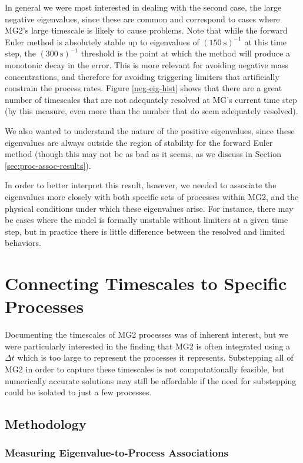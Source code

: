 \documentclass [11pt, proquest] {uwthesis}[2020/02/24]
\begin{document}
In general we were most interested in dealing with the second case, the large negative eigenvalues, since these are common and correspond to cases where MG2's large timescale is likely to cause problems. Note that while the forward Euler method is absolutely stable up to eigenvalues of $(\SI{150}{\second})^{-1}$ at this time step, the $(\SI{300}{\second})^{-1}$ threshold is the point at which the method will produce a monotonic decay in the error. This is more relevant for avoiding negative mass concentrations, and therefore for avoiding triggering limiters that artificially constrain the process rates. Figure \ref{neg-eig-hist} shows that there are a great number of timescales that are not adequately resolved at MG's current time step (by this measure, even more than the number that do seem adequately resolved).

We also wanted to understand the nature of the positive eigenvalues, since these eigenvalues are always outside the region of stability for the forward Euler method (though this may not be as bad as it seems, as we discuss in Section \ref{sec:proc-assoc-results}).

In order to better interpret this result, however, we needed to associate the eigenvalues more closely with both specific sets of processes within MG2, and the physical conditions under which these eigenvalues arise. For instance, there may be cases where the model is formally unstable without limiters at a given time step, but in practice there is little difference between the resolved and limited behaviors.

\section{Connecting Timescales to Specific Processes} \label{sec:proc-timescales}

Documenting the timescales of MG2 processes was of inherent interest, but we were particularly interested in the finding that MG2 is often integrated using a $\Delta t$ which is too large to represent the processes it represents. Substepping all of MG2 in order to capture these timescales is not computationally feasible, but numerically accurate solutions may still be affordable if the need for substepping could be isolated to just a few processes.

\subsection{Methodology}
\subsubsection{Measuring Eigenvalue-to-Process Associations}
\end{document}
